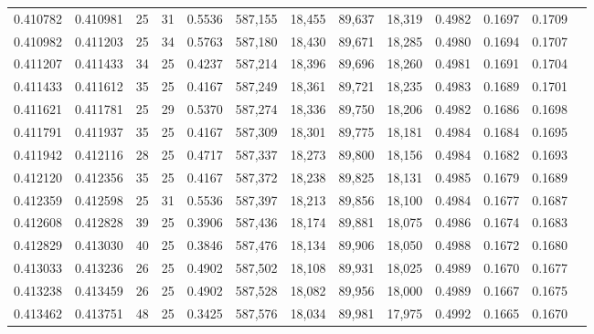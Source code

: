 \begin{tabular}{rrrrrrrrrrrrr}
0.410782 & 0.410981 &    25 &  31 &                                     0.5536 & 587,155 &  18,455 &  89,637 &  18,319 & 0.4982 & 0.1697 & 0.1709 \\
0.410982 & 0.411203 &    25 &  34 &                                     0.5763 & 587,180 &  18,430 &  89,671 &  18,285 & 0.4980 & 0.1694 & 0.1707 \\
0.411207 & 0.411433 &    34 &  25 &                                     0.4237 & 587,214 &  18,396 &  89,696 &  18,260 & 0.4981 & 0.1691 & 0.1704 \\
0.411433 & 0.411612 &    35 &  25 &                                     0.4167 & 587,249 &  18,361 &  89,721 &  18,235 & 0.4983 & 0.1689 & 0.1701 \\
0.411621 & 0.411781 &    25 &  29 &                                     0.5370 & 587,274 &  18,336 &  89,750 &  18,206 & 0.4982 & 0.1686 & 0.1698 \\
0.411791 & 0.411937 &    35 &  25 &                                     0.4167 & 587,309 &  18,301 &  89,775 &  18,181 & 0.4984 & 0.1684 & 0.1695 \\
0.411942 & 0.412116 &    28 &  25 &                                     0.4717 & 587,337 &  18,273 &  89,800 &  18,156 & 0.4984 & 0.1682 & 0.1693 \\
0.412120 & 0.412356 &    35 &  25 &                                     0.4167 & 587,372 &  18,238 &  89,825 &  18,131 & 0.4985 & 0.1679 & 0.1689 \\
0.412359 & 0.412598 &    25 &  31 &                                     0.5536 & 587,397 &  18,213 &  89,856 &  18,100 & 0.4984 & 0.1677 & 0.1687 \\
0.412608 & 0.412828 &    39 &  25 &                                     0.3906 & 587,436 &  18,174 &  89,881 &  18,075 & 0.4986 & 0.1674 & 0.1683 \\
0.412829 & 0.413030 &    40 &  25 &                                     0.3846 & 587,476 &  18,134 &  89,906 &  18,050 & 0.4988 & 0.1672 & 0.1680 \\
0.413033 & 0.413236 &    26 &  25 &                                     0.4902 & 587,502 &  18,108 &  89,931 &  18,025 & 0.4989 & 0.1670 & 0.1677 \\
0.413238 & 0.413459 &    26 &  25 &                                     0.4902 & 587,528 &  18,082 &  89,956 &  18,000 & 0.4989 & 0.1667 & 0.1675 \\
0.413462 & 0.413751 &    48 &  25 &                                     0.3425 & 587,576 &  18,034 &  89,981 &  17,975 & 0.4992 & 0.1665 & 0.1670 \\

\end{tabular}
